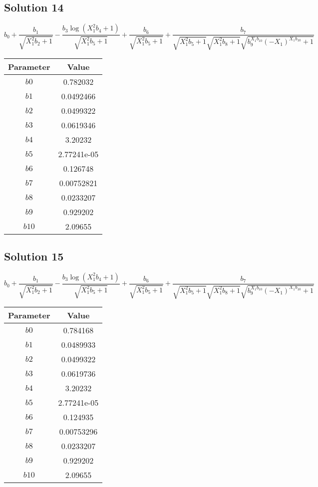 \documentclass{article}
\begin{document}
\vspace{1em}
\subsection*{Solution 14}
\[
b_{0} + \frac{b_{1}}{\sqrt{X_{1}^{2} b_{2} + 1}} - \frac{b_{3} \log{\left(X_{1}^{2} b_{4} + 1 \right)}}{\sqrt{X_{1}^{2} b_{5} + 1}} + \frac{b_{6}}{\sqrt{X_{1}^{2} b_{5} + 1}} + \frac{b_{7}}{\sqrt{X_{1}^{2} b_{5} + 1} \sqrt{X_{1}^{2} b_{8} + 1} \sqrt{b_{9}^{X_{1} b_{10}} \left(- X_{1}\right)^{X_{1} b_{10}} + 1}}
\]
\begin{center}
\begin{tabular}{cc}
\toprule
Parameter & Value \\
\midrule
$b0$ & 0.782032 \\
$b1$ & 0.0492466 \\
$b2$ & 0.0499322 \\
$b3$ & 0.0619346 \\
$b4$ & 3.20232 \\
$b5$ & 2.77241e-05 \\
$b6$ & 0.126748 \\
$b7$ & 0.00752821 \\
$b8$ & 0.0233207 \\
$b9$ & 0.929202 \\
$b10$ & 2.09655 \\
\bottomrule
\end{tabular}
\end{center}

\vspace{1em}
\subsection*{Solution 15}
\[
b_{0} + \frac{b_{1}}{\sqrt{X_{1}^{2} b_{2} + 1}} - \frac{b_{3} \log{\left(X_{1}^{2} b_{4} + 1 \right)}}{\sqrt{X_{1}^{2} b_{5} + 1}} + \frac{b_{6}}{\sqrt{X_{1}^{2} b_{5} + 1}} + \frac{b_{7}}{\sqrt{X_{1}^{2} b_{5} + 1} \sqrt{X_{1}^{2} b_{8} + 1} \sqrt{b_{9}^{X_{1} b_{10}} \left(- X_{1}\right)^{X_{1} b_{10}} + 1}}
\]
\begin{center}
\begin{tabular}{cc}
\toprule
Parameter & Value \\
\midrule
$b0$ & 0.784168 \\
$b1$ & 0.0489933 \\
$b2$ & 0.0499322 \\
$b3$ & 0.0619736 \\
$b4$ & 3.20232 \\
$b5$ & 2.77241e-05 \\
$b6$ & 0.124935 \\
$b7$ & 0.00753296 \\
$b8$ & 0.0233207 \\
$b9$ & 0.929202 \\
$b10$ & 2.09655 \\
\bottomrule
\end{tabular}
\end{center}

\vspace{1em}
\end{document}
